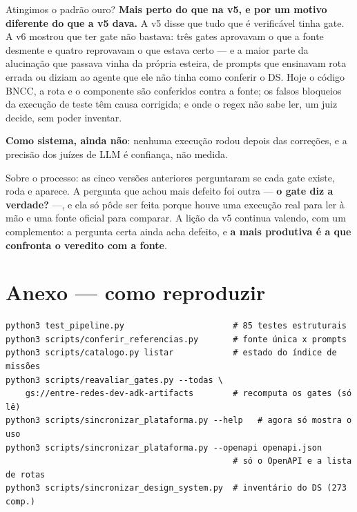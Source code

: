 \documentclass[11pt,a4paper]{article}
\begin{document}
\begin{vereditobox}{Atingimos o padrão ouro?}
\textbf{Mais perto do que na v5, e por um motivo diferente do que a v5 dava.} A v5 disse que tudo que é verificável tinha gate. A v6 mostrou que ter gate não bastava: três gates aprovavam o que a fonte desmente e quatro reprovavam o que estava certo --- e a maior parte da alucinação que passava vinha da própria esteira, de prompts que ensinavam rota errada ou diziam ao agente que ele não tinha como conferir o DS. Hoje o código BNCC, a rota e o componente são conferidos contra a fonte; os falsos bloqueios da execução de teste têm causa corrigida; e onde o regex não sabe ler, um juiz decide, sem poder inventar.

\textbf{Como sistema, ainda não}: nenhuma execução rodou depois das correções, e a precisão dos juízes de LLM é confiança, não medida.

Sobre o processo: as cinco versões anteriores perguntaram se cada gate existe, roda e aparece. A pergunta que achou mais defeito foi outra --- \textbf{o gate diz a verdade?} ---, e ela só pôde ser feita porque houve uma execução real para ler à mão e uma fonte oficial para comparar. A lição da v5 continua valendo, com um complemento: a pergunta certa ainda acha defeito, e \textbf{a mais produtiva é a que confronta o veredito com a fonte}.
\end{vereditobox}

\section*{Anexo --- como reproduzir}

\small
\begin{verbatim}
python3 test_pipeline.py                      # 85 testes estruturais
python3 scripts/conferir_referencias.py       # fonte única x prompts
python3 scripts/catalogo.py listar            # estado do índice de missões
python3 scripts/reavaliar_gates.py --todas \
    gs://entre-redes-dev-adk-artifacts        # recomputa os gates (só lê)
python3 scripts/sincronizar_plataforma.py --help   # agora só mostra o uso
python3 scripts/sincronizar_plataforma.py --openapi openapi.json
                                              # só o OpenAPI e a lista de rotas
python3 scripts/sincronizar_design_system.py  # inventário do DS (273 comp.)
\end{verbatim}
\normalsize
\end{document}
